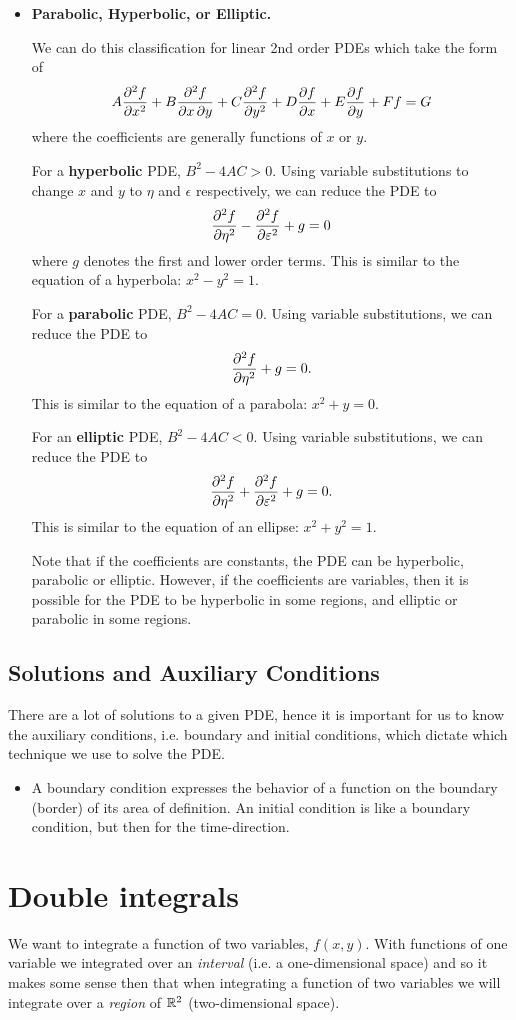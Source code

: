 \begin{itemize}
\item \textbf{Parabolic, Hyperbolic, or Elliptic.}

We can do this classification for linear 2nd order PDEs which take the form of 
\[ A\pdv[order={2}]{f}{x} + B\pdv{f}{x,y} + C\pdv[order={2}]{f}{y} + D\pdv{f}{x} + E\pdv{f}{y} + Ff = G \]
where the coefficients are generally functions of $x$ or $y$.

For a \textbf{hyperbolic} PDE, $B^2-4AC>0$. Using variable substitutions to change $x$ and $y$ to $\eta$ and $\epsilon$ respectively, we can reduce the PDE to \[ \pdv[order={2}]{f}{\eta} - \pdv[order={2}]{f}{\varepsilon} + g = 0 \] where $g$ denotes the first and lower order terms. This is similar to the equation of a hyperbola: $x^2-y^2=1$.

For a \textbf{parabolic} PDE, $B^2-4AC=0$. Using variable substitutions, we can reduce the PDE to \[ \pdv[order={2}]{f}{\eta} + g = 0. \] This is similar to the equation of a parabola: $x^2+y=0$.

For an \textbf{elliptic} PDE, $B^2-4AC<0$. Using variable substitutions, we can reduce the PDE to \[ \pdv[order={2}]{f}{\eta} + \pdv[order={2}]{f}{\varepsilon} + g = 0. \] This is similar to the equation of an ellipse: $x^2+y^2=1$.

Note that if the coefficients are constants, the PDE can be hyperbolic, parabolic or elliptic. However, if the coefficients are variables, then it is possible for the PDE to be hyperbolic in some regions, and elliptic or parabolic in some regions.
\end{itemize}

\subsection{Solutions and Auxiliary Conditions}
There are a lot of solutions to a given PDE, hence it is important for us to know the auxiliary conditions, i.e. boundary and initial conditions, which dictate which technique we use to solve the PDE.
\begin{itemize}
\item A boundary condition expresses the behavior of a function on the boundary (border) of its area of definition. An initial condition is like a boundary condition, but then for the time-direction.
\end{itemize}

\section{Double integrals}
We want to integrate a function of two variables, $f(x,y)$. With functions of one variable we integrated over an \emph{interval} (i.e. a one-dimensional space) and so it makes some sense then that when integrating a function of two variables we will integrate over a \emph{region} of $\mathbb R^2$ (two-dimensional space). 

